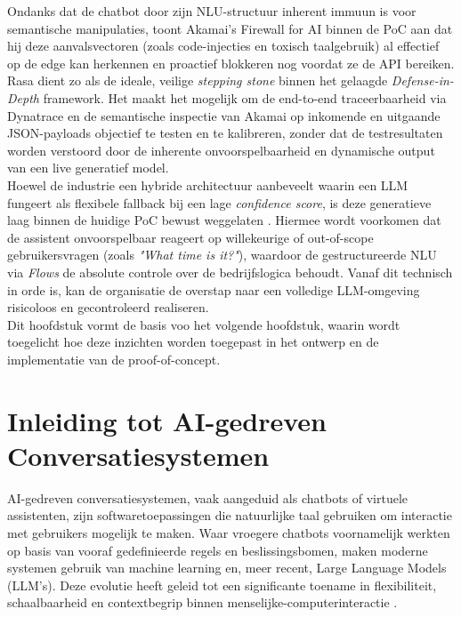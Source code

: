 Ondanks dat de chatbot door zijn NLU-structuur inherent immuun is voor semantische manipulaties, toont Akamai's Firewall for AI binnen de PoC aan dat hij deze aanvalsvectoren (zoals code-injecties en toxisch taalgebruik) al effectief op de edge kan herkennen en proactief blokkeren nog voordat ze de API bereiken. Rasa dient zo als de ideale, veilige \textit{stepping stone} binnen het gelaagde \textit{Defense-in-Depth} framework. Het maakt het mogelijk om de end-to-end traceerbaarheid via Dynatrace en de semantische inspectie van Akamai op inkomende en uitgaande JSON-payloads objectief te testen en te kalibreren, zonder dat de testresultaten worden verstoord door de inherente onvoorspelbaarheid en dynamische output van een live generatief model. \\

Hoewel de industrie een hybride architectuur aanbeveelt waarin een LLM fungeert als flexibele fallback bij een lage \textit{confidence score}, is deze generatieve laag binnen de huidige PoC bewust weggelaten \autocite{rasa2026}. Hiermee wordt voorkomen dat de assistent onvoorspelbaar reageert op willekeurige of out-of-scope gebruikersvragen (zoals \textit{"What time is it?"}), waardoor de gestructureerde NLU via \textit{Flows} de absolute controle over de bedrijfslogica behoudt. Vanaf dit technisch in orde is, kan de organisatie de overstap naar een volledige LLM-omgeving risicoloos en gecontroleerd realiseren.\\

Dit hoofdstuk vormt de basis voo het volgende hoofdstuk, waarin wordt toegelicht hoe deze inzichten worden toegepast in het ontwerp en de implementatie van de proof-of-concept.\\


\section{Inleiding tot AI-gedreven Conversatiesystemen}

AI-gedreven conversatiesystemen, vaak aangeduid als chatbots of virtuele assistenten, zijn softwaretoepassingen die natuurlijke taal gebruiken om interactie met gebruikers mogelijk te maken. Waar vroegere chatbots voornamelijk werkten op basis van vooraf gedefinieerde regels en beslissingsbomen, maken moderne systemen gebruik van machine learning en, meer recent, Large Language Models (LLM’s). Deze evolutie heeft geleid tot een significante toename in flexibiliteit, schaalbaarheid en contextbegrip binnen menselijke-computerinteractie \autocite{adamopoulou2020chatbots}.\\

